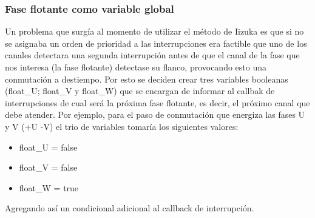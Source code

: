 \subsubsection{Fase flotante como variable global}
Un problema que surgía al momento de utilizar el método de Iizuka es que si no se asignaba un orden de prioridad a las interrupciones era factible que uno de los canales detectara una segunda interrupción antes de que el canal de la fase que nos interesa (la fase flotante) detectase su flanco, provocando esto una conmutación a destiempo. Por esto se deciden crear tres variables booleanas (float\_U; float\_V y float\_W) que se encargan de informar al callbak de interrupciones de cual será la próxima fase flotante, es decir, el próximo canal que debe atender.
Por ejemplo, para el paso de conmutación que energiza las fases U y V (+U -V) el trio de variables tomaría los siguientes valores:
\begin{itemize}
    \item float\_U = false
    \item float\_V = false
    \item float\_W = true
\end{itemize}
Agregando así un condicional adicional al callback de interrupción.
